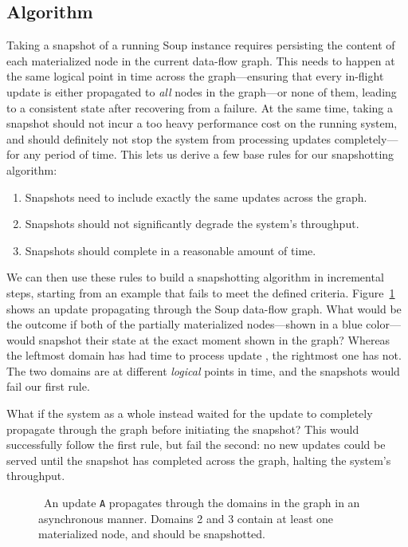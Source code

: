 \subsection{Algorithm}

Taking a snapshot of a running Soup instance requires persisting the content of
each materialized node in the current data-flow graph. This needs to happen at
the same logical point in time across the graph---ensuring that every in-flight
update is either propagated to \textit{all} nodes in the graph---or none of
them, leading to a consistent state after recovering from a failure. At the same
time, taking a snapshot should not incur a too heavy performance cost on the
running system, and should definitely not stop the system from processing
updates completely---for any period of time. This lets us derive a few base
rules for our snapshotting algorithm:

\begin{enumerate}
  \item Snapshots need to include exactly the same updates across the graph.
  \item Snapshots should not significantly degrade the system's throughput.
  \item Snapshots should complete in a reasonable amount of time.
\end{enumerate}

We can then use these rules to build a snapshotting algorithm in incremental
steps, starting from an example that fails to meet the defined criteria.
Figure~\ref{fig:bad-example} shows an update propagating through the Soup
data-flow graph. What would be the outcome if both of the partially materialized
nodes---shown in a blue color---would snapshot their state at the exact moment
shown in the graph? Whereas the leftmost domain has had time to process update
, the rightmost one has not. The two domains are at different
\textit{logical} points in time, and the snapshots would fail our first rule.

What if the system as a whole instead waited for the update to completely
propagate through the graph before initiating the snapshot? This would
successfully follow the first rule, but fail the second: no new updates could be
served until the snapshot has completed across the graph, halting
the system's throughput.

\begin{figure}[H]
  \centering
  
  \caption{\
    An update \texttt{A} propagates through the domains in the graph in an
    asynchronous manner. Domains 2 and 3 contain at least one materialized node,
    and should be snapshotted.
  }\label{fig:bad-example}
\end{figure}


